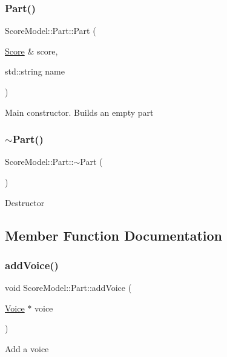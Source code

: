 \subsubsection{\texorpdfstring{Part()}{Part()}}
{\footnotesize\ttfamily Score\+Model\+::\+Part\+::\+Part (\begin{DoxyParamCaption}\item[{\mbox{\hyperlink{classScoreModel_1_1Score}{Score}} \&}]{score,  }\item[{std\+::string}]{name }\end{DoxyParamCaption})}

Main constructor. Builds an empty part \mbox{\label{classScoreModel_1_1Part_aa9f6951242b54a9ab4cd953bb2879238}} 
\subsubsection{\texorpdfstring{$\sim$Part()}{~Part()}}
{\footnotesize\ttfamily Score\+Model\+::\+Part\+::$\sim$\+Part (\begin{DoxyParamCaption}{ }\end{DoxyParamCaption})}

Destructor 

\subsection{Member Function Documentation}
\mbox{\label{classScoreModel_1_1Part_ad022dd411522ff8a8c001b93bd65c2a4}} 
\subsubsection{\texorpdfstring{addVoice()}{addVoice()}}
{\footnotesize\ttfamily void Score\+Model\+::\+Part\+::add\+Voice (\begin{DoxyParamCaption}\item[{\mbox{\hyperlink{classScoreModel_1_1Voice}{Voice}} $\ast$}]{voice }\end{DoxyParamCaption})}

Add a voice \mbox{\label{classScoreModel_1_1Part_afeca4670f40c43b42343d55f71d242af}} 
